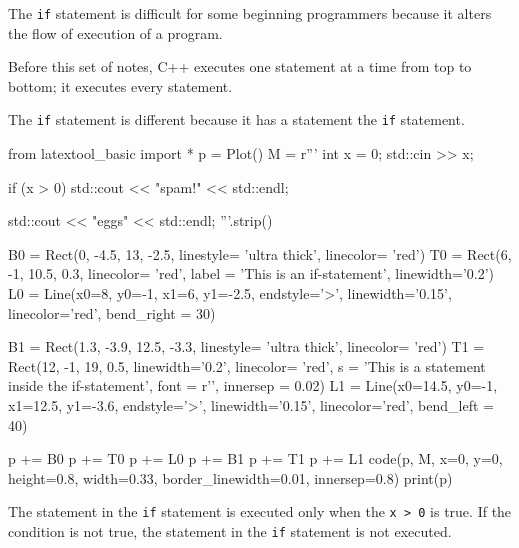 \newpage{}

The \verb!if! statement is difficult for some beginning programmers
because it alters the flow of execution of a program.

Before this set of notes, C++ executes one statement at a time from top
to bottom; it executes every statement.

The \verb!if! statement is different because it has a statement
 the \verb!if! statement.
\begin{python}
from latextool_basic import *
p = Plot()
M = r'''
int x = 0;
std::cin >> x;
                                                                          
if (x > 0)
    std::cout << "spam!" << std::endl;

std::cout << "eggs" << std::endl;
'''.strip()

B0 = Rect(0, -4.5, 13, -2.5, linestyle= 'ultra thick', linecolor= 'red')
T0 = Rect(6, -1, 10.5, 0.3,  linecolor= 'red', label = 'This is an if-statement', linewidth='0.2')
L0 = Line(x0=8, y0=-1, x1=6, y1=-2.5, endstyle='>', linewidth='0.15', linecolor='red', bend_right = 30)

B1 = Rect(1.3, -3.9, 12.5, -3.3, linestyle= 'ultra thick', linecolor= 'red')
T1 = Rect(12, -1, 19, 0.5, linewidth='0.2', linecolor= 'red', s = 'This is a statement inside the if-statement', font = r'\large', innersep = 0.02)
L1 = Line(x0=14.5, y0=-1, x1=12.5, y1=-3.6, endstyle='>', linewidth='0.15', linecolor='red', bend_left = 40)

p += B0
p += T0
p += L0
p += B1
p += T1
p += L1
code(p, M, x=0, y=0, height=0.8, width=0.33, border_linewidth=0.01, innersep=0.8)
print(p)
\end{python}


The statement in the \verb!if! statement is executed only when the
\verb!x > 0! is true. If the condition is not true, the
statement in the \verb!if! statement is not executed.

